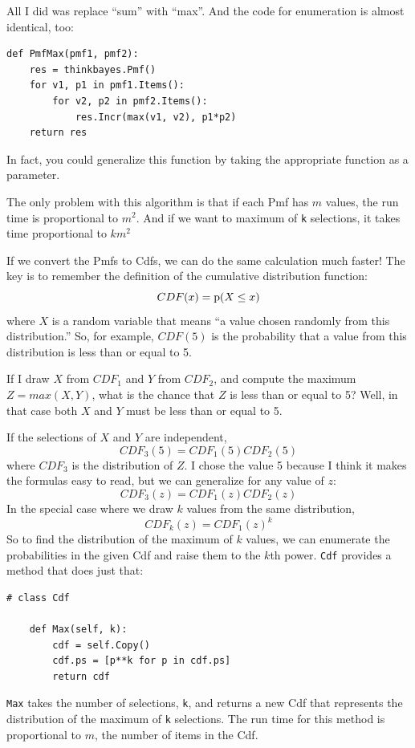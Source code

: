 \documentclass[12pt]{book}
\begin{document}
All I did was replace ``sum'' with ``max''.  And the code
for enumeration is almost identical, too:

\begin{verbatim}
def PmfMax(pmf1, pmf2):
    res = thinkbayes.Pmf()
    for v1, p1 in pmf1.Items():
        for v2, p2 in pmf2.Items():
            res.Incr(max(v1, v2), p1*p2)
    return res
\end{verbatim}

In fact, you could generalize this function by taking the
appropriate function as a parameter.

The only problem with this algorithm is that if each Pmf
has $m$ values, the run time is proportional to $m^2$.
And if we want to maximum of {\tt k} selections, it takes
time proportional to $k m^2$

If we convert the Pmfs to Cdfs, we can do the same calculation
much faster!  The key is to remember the definition of the
cumulative distribution function:
%
\[ CDF(x) = \mathrm{p}(X \le x) \]
%
where $X$ is a random variable that means ``a value chosen
randomly from this distribution.''  So, for example, $CDF(5)$
is the probability that a value from this distribution is less
than or equal to 5.

If I draw $X$ from $CDF_1$ and $Y$ from $CDF_2$, and compute
the maximum $Z = max(X, Y)$, what is the chance that $Z$ is
less than or equal to 5?  Well, in that case both $X$ and $Y$
must be less than or equal to 5.

If the selections of $X$ and $Y$ are independent,
%
\[ CDF_3(5) = CDF_1(5) CDF_2(5) \] 
%
where $CDF_3$ is the distribution of $Z$.  I chose the value
5 because I think it makes the formulas easy to read, but we
can generalize for any value of $z$:
%
\[ CDF_3(z) = CDF_1(z) CDF_2(z) \]
%
In the special case where we draw $k$ values from the same
distribution, 
%
\[ CDF_k(z) = CDF_1(z)^k \]
%
So to find the distribution of the maximum of $k$ values,
we can enumerate the probabilities in the given Cdf
and raise them to the $k$th power.
\verb"Cdf" provides a method that does just that:

\begin{verbatim}
# class Cdf

    def Max(self, k):
        cdf = self.Copy()
        cdf.ps = [p**k for p in cdf.ps]
        return cdf
\end{verbatim}

\verb"Max" takes the number of selections, {\tt k}, and returns a new
Cdf that represents the distribution of the maximum of {\tt k}
selections.  The run time for this method is proportional to 
$m$, the number of items in the Cdf.
\end{document}
